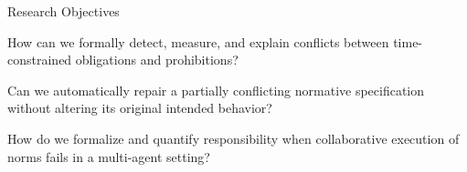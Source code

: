 \documentclass[9pt]{beamer}
\begin{document}
\begin{frame}{Research Objectives}
  \begin{tcolorbox}[colback=blue!5, colframe=blue!80, title=RQ1 / Chapter 3: Static Conflict Analysis]
    How can we formally detect, measure, and explain conflicts between time-constrained obligations and prohibitions?
  \end{tcolorbox}
  
  
  
  \begin{tcolorbox}[colback=orange!5, colframe=orange!80, title=RQ2 / Chapter 3: Conflict Resolution]
    Can we automatically repair a partially conflicting normative specification without altering its original intended behavior?
  \end{tcolorbox}


  
  \begin{tcolorbox}[colback=green!5, colframe=green!80, title=RQ3 / Chapter 4: Dynamic Blame Attribution]
    How do we formalize and quantify responsibility when collaborative execution of norms fails in a multi-agent setting?
  \end{tcolorbox}
\end{frame}



	
	
	
	
\end{document}

